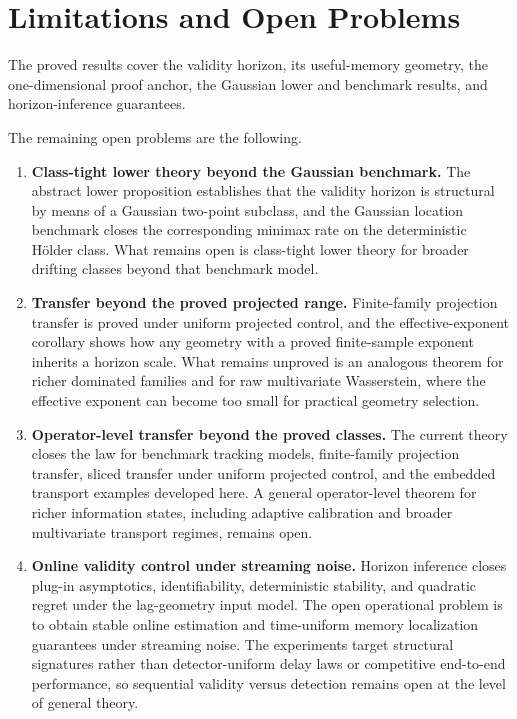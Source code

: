 \section{Limitations and Open Problems}\label{sec:limitations_open_problems}

The proved results cover the validity horizon, its useful-memory geometry, the
one-dimensional proof anchor, the Gaussian lower and benchmark results, and
horizon-inference guarantees.

The remaining open problems are the following.

\begin{enumerate}[label=\textbf{(\arabic*)},leftmargin=*,itemsep=2pt,topsep=3pt]
  \item \textbf{Class-tight lower theory beyond the Gaussian benchmark.}
  The abstract lower proposition establishes that the validity horizon
  is structural by means of a Gaussian two-point subclass, and the Gaussian
  location benchmark closes the corresponding minimax rate on the deterministic
  H\"older class. What remains open is class-tight lower theory for broader
  drifting classes beyond that benchmark model.

  \item \textbf{Transfer beyond the proved projected range.}
  Finite-family projection transfer is proved under uniform projected control,
  and the effective-exponent corollary shows how any geometry with a
  proved finite-sample exponent inherits a horizon scale. What remains unproved
  is an analogous theorem for richer dominated families and for raw
  multivariate Wasserstein, where the effective exponent can become too small
    for practical geometry selection.

  \item \textbf{Operator-level transfer beyond the proved classes.}
  The current theory closes the law for benchmark tracking models, finite-family
  projection transfer, sliced transfer under uniform projected control, and the
  embedded transport examples developed here. A general operator-level theorem
  for richer information states, including adaptive calibration and broader
  multivariate transport regimes, remains open.

  \item \textbf{Online validity control under streaming noise.}
  Horizon inference closes plug-in asymptotics, identifiability, deterministic
  stability, and quadratic regret under the lag-geometry input model. The open
  operational problem is to obtain stable online estimation and time-uniform
  memory localization guarantees under streaming noise. The experiments target
  structural signatures rather than detector-uniform delay laws or competitive
  end-to-end performance, so sequential validity versus detection remains open
  at the level of general theory.


\end{enumerate}
